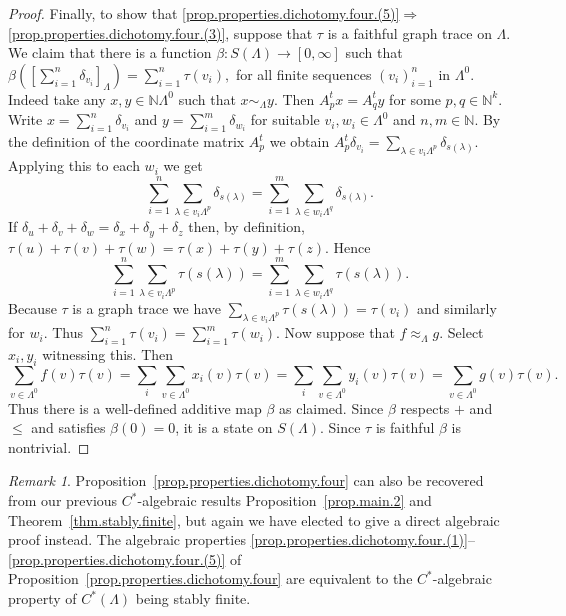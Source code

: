 \documentclass[a4paper, 12pt]{amsart}
\numberwithin{equation}{section}
\newcounter{theorem}
\theoremstyle{remark}
\newtheorem{remark}[theorem]{Remark}
\theoremstyle{definition}
\begin{document}
\begin{proof}
Finally, to show that
\eqref{prop.properties.dichotomy.four.(5)}$\Rightarrow$\eqref{prop.properties.dichotomy.four.(3)},
suppose that $\tau$ is a faithful graph trace on $\Lambda$. We claim that there is a
function $\beta\colon S(\Lambda)\to [0,\infty]$ such that
$\beta({{[{\sum_{i=1}^n\delta_{v_i}}]_\Lambda}})=\sum_{i=1}^n \tau(v_i),$ for all finite
sequences $(v_i)_{i=1}^n$ in $\Lambda^0$. Indeed take any $x,y\in {\mathbb{N}}\Lambda^0$ such that
$x\sim_\Lambda y$. Then $A^t_px=A^t_qy$ for some $p,q\in {\mathbb{N}}^k$. Write
$x=\sum_{i=1}^n\delta_{v_i}$ and $y=\sum_{i=1}^m\delta_{w_i}$ for suitable $v_i,w_i\in
\Lambda^0$ and $n,m\in {\mathbb{N}}$. By the definition of the coordinate matrix $A^t_p$ we obtain
$A^t_p\delta_{v_i}=\sum_{\lambda\in v_i\Lambda^p} \delta_{s(\lambda)}$. Applying this to
each $w_i$ we get
$$\sum_{i=1}^n\sum_{\lambda\in v_i\Lambda^p}  \delta_{s(\lambda)}=\sum_{i=1}^m\sum_{\lambda\in w_i\Lambda^q} \delta_{s(\lambda)}.$$
If $\delta_u+\delta_v+\delta_w=\delta_x+\delta_y+\delta_z$ then, by definition,
$\tau(u)+\tau(v)+\tau(w)=\tau(x)+\tau(y)+\tau(z)$. Hence
$$\sum_{i=1}^n\sum_{\lambda\in v_i\Lambda^p} \tau(s(\lambda))=\sum_{i=1}^m\sum_{\lambda\in w_i\Lambda^q} \tau(s(\lambda)).$$
Because $\tau$ is a graph trace we have $\sum_{\lambda\in v_i\Lambda^p}
\tau(s(\lambda))=\tau(v_i)$ and similarly for $w_i$. Thus
$\sum_{i=1}^n\tau(v_i)=\sum_{i=1}^m \tau(w_i)$.
Now suppose that $f\approx_{\Lambda} g$. Select $x_i,y_i$ witnessing this. Then
\[
\sum_{v \in \Lambda^0} f(v)\tau(v)
	= \sum_i \sum_{v \in \Lambda^0} x_i(v)\tau(v)
	= \sum_i \sum_{v \in \Lambda^0} y_i(v)\tau(v)
	= \sum_{v \in \Lambda^0} g(v)\tau(v).
\]
Thus there is a well-defined additive map $\beta$ as claimed. Since $\beta$
respects $+$ and $\leq$ and satisfies $\beta(0) = 0$, it is a state on $S(\Lambda)$.
Since $\tau$ is faithful $\beta$ is nontrivial.
\end{proof}

\begin{remark}
Proposition~\ref{prop.properties.dichotomy.four} can also be recovered from our
previous $C^*$-algebraic results Proposition~\ref{prop.main.2} and
Theorem~\ref{thm.stably.finite}, but again we have elected to give a direct
algebraic proof instead. The algebraic properties \eqref{prop.properties.dichotomy.four.(1)}--\eqref{prop.properties.dichotomy.four.(5)} of
Proposition~\ref{prop.properties.dichotomy.four} are equivalent to the $C^*$-algebraic
property of $C^*(\Lambda)$ being stably finite.
\end{remark}
\end{document}
